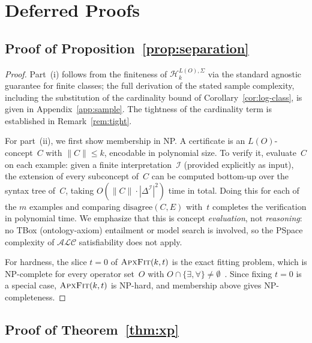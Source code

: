 \documentclass[accepted]{uai2026} %
\theoremstyle{definition}
\theoremstyle{remark}
\newcommand{\AF}{\textsc{ApxFit}}
\newcommand{\disagree}{\mathrm{disagree}}
\begin{document}
\section{Deferred Proofs}\label{app:proofs}

\subsection{Proof of
Proposition~\ref{prop:separation}}\label{app:sep-proof}

\begin{proof}
Part~(i) follows from the finiteness of
$\mathcal{H}_k^{L(O),\Sigma}$ via the standard agnostic
guarantee for finite classes; the full derivation of the stated
sample complexity, including the substitution of the cardinality
bound of Corollary~\ref{cor:log-class}, is given in
Appendix~\ref{app:sample}. The tightness of the cardinality term
is established in Remark~\ref{rem:tight}.

For part~(ii), we first show membership in NP. A certificate is
an $L(O)$-concept~$C$ with $\|C\| \leq k$, encodable in
polynomial size. To verify it, evaluate~$C$ on each
example: given a finite interpretation~$\mathcal{I}$ (provided
explicitly as input), the extension of every subconcept of~$C$
can be computed bottom-up over the syntax tree of~$C$, taking
$O(\|C\| \cdot |\Delta^{\mathcal{I}}|^2)$ time in total. Doing
this for each of the $m$ examples and comparing
$\disagree(C, E)$ with~$t$ completes the verification in
polynomial time. We emphasize that this is concept
\emph{evaluation}, not \emph{reasoning}: no TBox
(ontology-axiom) entailment or model search is involved, so the
PSpace complexity of $\mathcal{ALC}$ satisfiability does not
apply.

For hardness, the slice $t = 0$ of $\AF(k,t)$ is the
exact fitting problem, which is NP-complete for every operator
set~$O$ with $O \cap \{\exists, \forall\} \neq
\emptyset$~\citep{DBLP:conf/semweb/FunkJV25}. Since fixing
$t = 0$ is a special case, $\AF(k,t)$ is NP-hard, and membership
above gives NP-completeness.
\end{proof}

\subsection{Proof of
Theorem~\ref{thm:xp}}\label{app:xp-proof}
\end{document}
